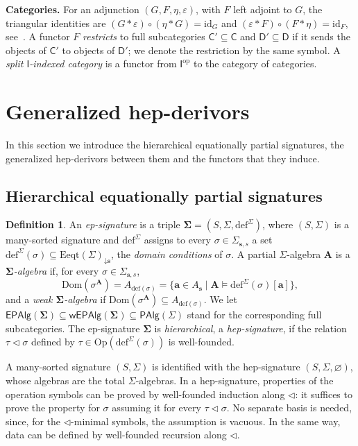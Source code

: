 \documentclass[a4paper,reqno]{amsart}
\newcommand{\vs}[1]{\mathbin{\downarrow}#1}      %
\newcommand{\sig}[1]{\mathbf{#1}}                %
\newcommand{\Dom}{\mathrm{Dom}}
\newcommand{\Op}{\mathrm{Op}}
\newcommand{\Eeqt}{\mathrm{Eeqt}}
\newcommand{\id}{\mathrm{id}}
\newcommand{\EPAlg}{\mathsf{EPAlg}}
\newcommand{\PAlg}{\mathsf{PAlg}}
\newcommand{\defi}{\mathrm{def}}
\theoremstyle{plain}
\theoremstyle{definition}
\newtheorem{definition}[theorem]{Definition}
\begin{document}
\textbf{Categories.}
For an adjunction $(G,F,\eta,\varepsilon)$, with $F$ left adjoint to $G$, the triangular identities are $(G\ast\varepsilon)\circ(\eta\ast G)=\id_{G}$ and $(\varepsilon\ast F)\circ(F\ast\eta)=\id_{F}$, see~\cite{sM98}.
A functor $F$ \emph{restricts} to full subcategories $\mathsf{C}'\subseteq\mathsf{C}$ and $\mathsf{D}'\subseteq\mathsf{D}$ if it sends the objects of $\mathsf{C}'$ to objects of $\mathsf{D}'$; we denote the restriction by the same symbol.
A \emph{split $\mathsf{I}$-indexed category} is a functor from $\mathsf{I}^{\mathrm{op}}$ to the category of categories.

\section{Generalized hep-derivors}\label{SGenHepDerivors}

In this section we introduce the hierarchical equationally partial signatures, the generalized hep-derivors between them and the functors that they induce.

\subsection{Hierarchical equationally partial signatures}

\begin{definition}\label{DEpSignature}
An \emph{ep-signature} is a triple $\sig{\Sigma}=(S,\Sigma,\defi^{\Sigma})$, where $(S,\Sigma)$ is a many-sorted signature and $\defi^{\Sigma}$ assigns to every $\sigma\in\Sigma_{\mathbf{s},s}$ a set $\defi^{\Sigma}(\sigma)\subseteq\Eeqt(\Sigma)_{\vs{\mathbf{s}}}$, the \emph{domain conditions} of $\sigma$.
A partial $\Sigma$-algebra $\mathbf{A}$ is a \emph{$\sig{\Sigma}$-algebra} if, for every $\sigma\in\Sigma_{\mathbf{s},s}$,
$$
\Dom(\sigma^{\mathbf{A}})=A_{\defi(\sigma)}=\{\mathbf{a}\in A_{\mathbf{s}}\mid\mathbf{A}\models\defi^{\Sigma}(\sigma)[\mathbf{a}]\},
$$
and a \emph{weak $\sig{\Sigma}$-algebra} if $\Dom(\sigma^{\mathbf{A}})\subseteq A_{\defi(\sigma)}$.
We let $\EPAlg(\sig{\Sigma})\subseteq\mathsf{wEPAlg}(\sig{\Sigma})\subseteq\PAlg(\Sigma)$ stand for the corresponding full subcategories.
The ep-signature $\sig{\Sigma}$ is \emph{hierarchical}, a \emph{hep-signature}, if the relation $\tau\lhd\sigma$ defined by $\tau\in\Op(\defi^{\Sigma}(\sigma))$ is well-founded.
\end{definition}

A many-sorted signature $(S,\Sigma)$ is identified with the hep-signature $(S,\Sigma,\varnothing)$, whose algebras are the total $\Sigma$-algebras.
In a hep-signature, properties of the operation symbols can be proved by well-founded induction along $\lhd$: it suffices to prove the property for $\sigma$ assuming it for every $\tau\lhd\sigma$.
No separate basis is needed, since, for the $\lhd$-minimal symbols, the assumption is vacuous.
In the same way, data can be defined by well-founded recursion along $\lhd$.
\end{document}
